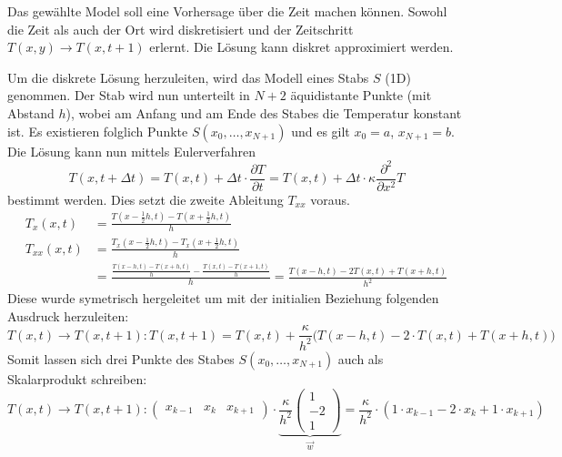 Das gewählte Model soll eine Vorhersage über die Zeit machen können. Sowohl die Zeit als auch der Ort wird diskretisiert und der Zeitschritt $T(x,y) \rightarrow T(x,t+1)$ erlernt. Die Lösung kann diskret approximiert werden. 

Um die diskrete Lösung herzuleiten, wird das Modell eines Stabs $S$ (1D) genommen. Der Stab wird nun unterteilt in $N+2$ äquidistante Punkte (mit Abstand $h$), wobei am Anfang und am Ende des Stabes die Temperatur konstant ist. Es existieren folglich Punkte $S(x_0, \dots, x_{N+1})$ und es gilt $x_0 = a$, $x_{N+1} = b$. 
Die Lösung kann nun mittels Eulerverfahren
\begin{equation}
T(x,t+\Delta t) = T(x,t) + \Delta t \cdot  \frac{\partial T}{\partial t} = T(x,t) + \Delta t \cdot \kappa \frac{\partial^2}{\partial x^2} T
\end{equation}
bestimmt werden. Dies setzt die zweite Ableitung $T_{xx}$ voraus.
\begin{align}
T_{x}(x, t)  &= \frac{T(x-\frac{1}{2}h, t) - T(x+\frac{1}{2}h, t)}{h}\\
T_{xx}(x, t) &= \frac{T_{x}(x-\frac{1}{2}h, t) - T_{x}(x+\frac{1}{2}h, t)}{h} \\
&= \frac{\frac{T(x-h, t) - T(x+h, t)}{h} - \frac{T(x, t) - T(x+1,t)}{h}}{h} = \frac{T(x-h, t) - 2 T(x, t) + T(x+h, t)}{h^{2}}
\end{align}	
Diese wurde symetrisch hergeleitet um mit der initialien Beziehung folgenden Ausdruck herzuleiten:
\begin{equation}
T(x,t) \rightarrow T(x,t+1) : T(x,t+1) = T(x,t) + \frac{\kappa}{h^{2}} \Big( T(x-h,t) - 2 \cdot T(x,t) + T(x+h,t)  \Big)
\end{equation}
Somit lassen sich drei Punkte des Stabes $S(x_0, \dots, x_{N+1})$ auch als Skalarprodukt schreiben:
\begin{equation}
T(x,t) \rightarrow T(x,t+1) : \begin{pmatrix} x_{k-1} & x_{k} & x_{k+1} \end{pmatrix} \cdot \underbrace{\frac{\kappa}{h^2} \begin{pmatrix} 1 \\ -2 \\ 1 \end{pmatrix}}_{\vec{w}} =  \frac{\kappa}{h^2} \cdot \left( 1 \cdot x_{k-1} - 2 \cdot x_{k} + 1 \cdot x_{k+1} \right)
\label{eq:sumvec}
\end{equation}

